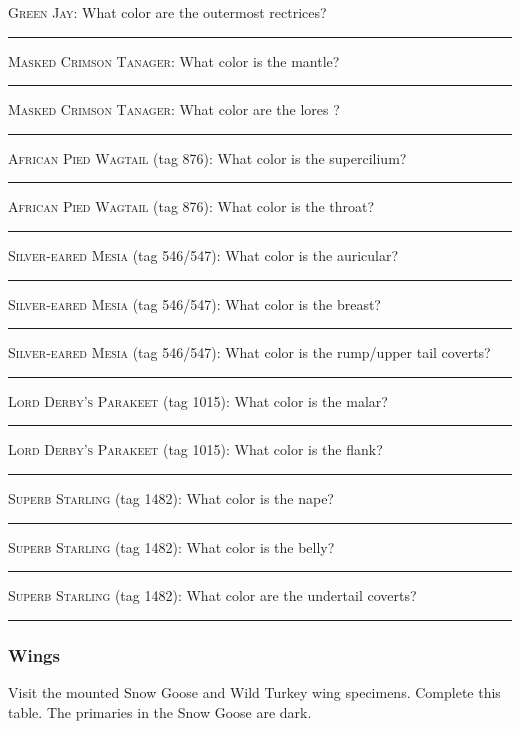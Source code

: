 \documentclass[10pt]{article}
\newcommand{\blankline}{\rule{2in}{0.4pt}}
\begin{document}
\textsc{Green Jay:} What color are the outermost rectrices? \blankline

\bigskip


\textsc{Masked Crimson Tanager:} What color is the mantle? \blankline

\bigskip

\textsc{Masked Crimson Tanager:} What color are the lores ? \blankline

\bigskip

 
\textsc{African Pied Wagtail} (tag 876): What color is the supercilium? \blankline

\bigskip

\textsc{African Pied Wagtail} (tag 876): What color is the throat? \blankline

\bigskip

\textsc{Silver-eared Mesia} (tag 546/547): What color is the auricular? \blankline

\bigskip

\textsc{Silver-eared Mesia} (tag 546/547): What color is the breast? \blankline

\bigskip

\textsc{Silver-eared Mesia} (tag 546/547): What color is the rump/upper tail coverts? \blankline

\bigskip


\textsc{Lord Derby's Parakeet} (tag 1015): What color is the malar? \blankline

\bigskip

\textsc{Lord Derby's Parakeet} (tag 1015): What color is the flank? \blankline

\bigskip

\textsc{Superb Starling} (tag 1482): What color is the nape? \blankline

\bigskip

\textsc{Superb Starling} (tag 1482): What color is the belly? \blankline

\bigskip
\textsc{Superb Starling} (tag 1482): What color are the undertail coverts?   \blankline

\subsubsection*{Wings}

Visit the mounted Snow Goose and Wild Turkey wing specimens. Complete this table. The primaries in the Snow Goose are dark. 
\end{document}
